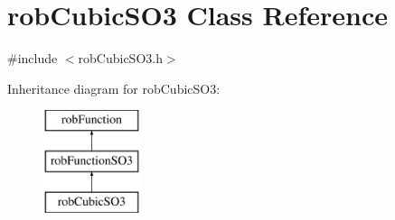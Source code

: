 \hypertarget{classrob_cubic_s_o3}{}\section{rob\+Cubic\+S\+O3 Class Reference}
\label{classrob_cubic_s_o3}


{\ttfamily \#include $<$rob\+Cubic\+S\+O3.\+h$>$}

Inheritance diagram for rob\+Cubic\+S\+O3\+:\begin{figure}[H]
\begin{center}
\leavevmode
\includegraphics[height=3.000000cm]{d4/dc8/classrob_cubic_s_o3}
\end{center}
\end{figure}
